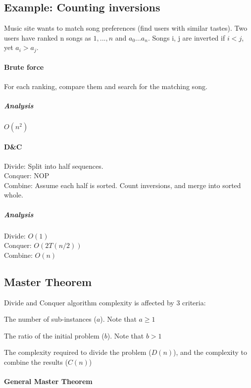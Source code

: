 \documentclass[a4paper]{article}
\newenvironment{enumerate*}%
  {\begin{enumerate}%
    \setlength{\itemsep}{0.5pt}%
    \setlength{\parsep}{0pt}%
    \setlength{\parskip}{0pt}}%
  {\end{enumerate}}
\begin{document}
\subsection{Example: Counting inversions}
Music site wants to match song preferences (find users with similar tastes). Two users have ranked n songs as $1,...,n$ and $a_0...a_n$. Songs i, j are inverted if $i<j$, yet $a_i > a_j$.

\paragraph{Brute force}
For each ranking, compare them and search for the matching song.

\subparagraph{Analysis}
$O(n^2)$

\paragraph{D\&C}

Divide: Split into half sequences.\\
Conquer: NOP\\
Combine: Assume each half is sorted. Count inversions, and merge into sorted whole.\\

\subparagraph{Analysis}

Divide: $O(1)$\\
Conquer: $O(2T(n/2))$\\
Combine: $O(n)$\\

\subsection{Master Theorem}

Divide and Conquer algorithm complexity is affected by 3 criteria:

\begin{enumerate*}
  \item The number of sub-instances ($a$). Note that $a \ge 1$
  \item The ratio of the initial problem ($b$). Note that $b > 1$
  \item The complexity required to divide the problem ($D(n)$), and the complexity to combine the results ($C(n)$)
\end{enumerate*}

\paragraph{General Master Theorem}
\end{document}
